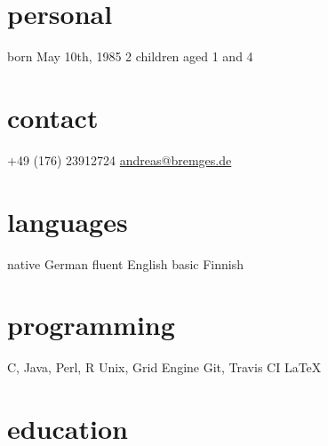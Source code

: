 \documentclass[]{friggeri-cv}
\begin{document}


\begin{aside} %
\section{personal}
born May 10th, 1985
2 children aged 1 and 4
\section{contact}
+49 (176) 23912724
\href{mailto:andreas@bremges.de}{andreas@bremges.de}
\section{languages}
native German
fluent English
basic Finnish
\section{programming}
C, Java, Perl, R
Unix, Grid Engine
Git, Travis CI
\LaTeX
\end{aside}


\section{education}
\end{document}

